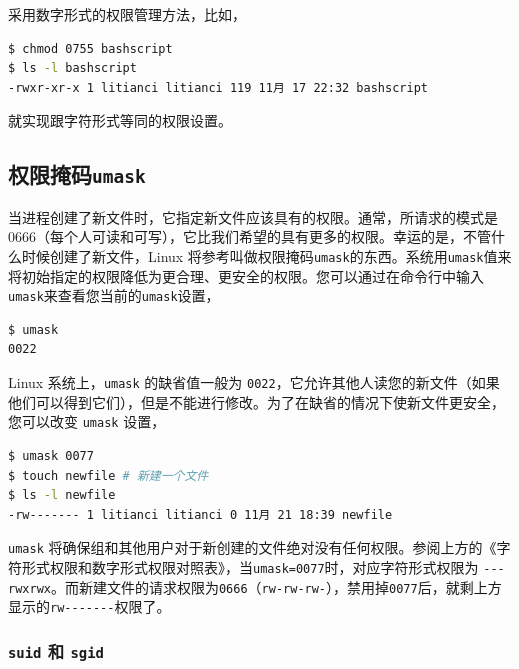 \documentclass[doctor,openright,twoside]{sjtuthesis}
\newcommand{\passthrough}[1]{#1}
\theoremstyle{plain}
\theoremstyle{definition}
\theoremstyle{remark}
\theoremstyle{ocrenumbox}
\theoremstyle{plain}
\begin{document}
采用数字形式的权限管理方法，比如，

\begin{lstlisting}[language=bash]
$ chmod 0755 bashscript
$ ls -l bashscript
-rwxr-xr-x 1 litianci litianci 119 11月 17 22:32 bashscript
\end{lstlisting}

就实现跟字符形式等同的权限设置。

\hypertarget{umask}{%
\subsection{\texorpdfstring{权限掩码\texttt{umask}}{权限掩码umask}}\label{umask}}

当进程创建了新文件时，它指定新文件应该具有的权限。通常，所请求的模式是 0666（每个人可读和可写），它比我们希望的具有更多的权限。幸运的是，不管什么时候创建了新文件，Linux 将参考叫做权限掩码\passthrough{\lstinline!umask!}的东西。系统用\passthrough{\lstinline!umask!}值来将初始指定的权限降低为更合理、更安全的权限。您可以通过在命令行中输入\passthrough{\lstinline!umask!}来查看您当前的\passthrough{\lstinline!umask!}设置，

\begin{lstlisting}[language=bash]
$ umask
0022
\end{lstlisting}

Linux 系统上，\passthrough{\lstinline!umask!} 的缺省值一般为 \passthrough{\lstinline!0022!}，它允许其他人读您的新文件（如果他们可以得到它们），但是不能进行修改。为了在缺省的情况下使新文件更安全，您可以改变 \passthrough{\lstinline!umask!} 设置，

\begin{lstlisting}[language=bash]
$ umask 0077
$ touch newfile # 新建一个文件
$ ls -l newfile
-rw------- 1 litianci litianci 0 11月 21 18:39 newfile
\end{lstlisting}

\passthrough{\lstinline!umask!} 将确保组和其他用户对于新创建的文件绝对没有任何权限。参阅上方的《字符形式权限和数字形式权限对照表》，当\passthrough{\lstinline!umask=0077!}时，对应字符形式权限为 \passthrough{\lstinline!---rwxrwx!}。而新建文件的请求权限为\passthrough{\lstinline!0666!}（\passthrough{\lstinline!rw-rw-rw-!}），禁用掉\passthrough{\lstinline!0077!}后，就剩上方显示的\passthrough{\lstinline!rw-------!}权限了。

\hypertarget{suid--sgid}{%
\subsubsection{\texorpdfstring{\texttt{suid} 和 \texttt{sgid}}{suid 和 sgid}}\label{suid--sgid}}
\end{document}
